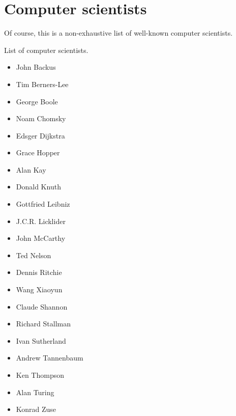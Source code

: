 \section{Computer scientists}
%
Of course, this is a non-exhaustive list of well-known computer scientists.

List of computer scientists.

\begin{itemize}
  \item John Backus
  \item Tim Berners-Lee
  \item George Boole
  \item Noam Chomsky
  \item Edsger Dijkstra
  \item Grace Hopper
  \item Alan Kay
  \item Donald Knuth
  \item Gottfried Leibniz
  \item J.C.R. Licklider
  \item John McCarthy
  \item Ted Nelson
  \item Dennis Ritchie
  \item Wang Xiaoyun
  \item Claude Shannon
  \item Richard Stallman
  \item Ivan Sutherland
  \item Andrew Tannenbaum
  \item Ken Thompson
  \item Alan Turing
  \item Konrad Zuse
\end{itemize}
